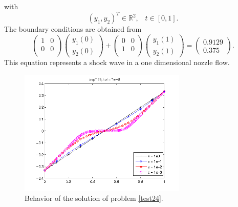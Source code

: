 \documentclass[<options>]{article}
\def \RR {{\mathbb{R}}}
\begin{document}
with
\[
(y_1,y_2)^T \in \RR^{2}, \;\;\;  t \in [0,1].
\]
The  boundary conditions are obtained from
\begin{equation*}
\left(
  \begin{array}{cc}
    1 & 0 \\
    0 & 0 \\
  \end{array}
\right)
\left(\begin{array}{c}
y_{1}(0)\\
y_{2}(0)
\end{array}\right)
+
\left(
  \begin{array}{cc}
    0 & 0 \\
    1 & 0 \\
  \end{array}
\right)
\left(\begin{array}{c}
y_{1}(1)\\
y_{2}(1)
\end{array}\right)=\left(\begin{array}{c}
0.9129 \\
0.375
\end{array}\right).
\end{equation*}
This equation represents a shock wave in a one dimensional nozzle flow.

\begin{figure}[htb]
\centerline{\includegraphics[height=6cm]{Prob25}}
\caption{Behavior of the solution of problem \ref{test24}.}
\end{figure}
\newpage
\end{document}
